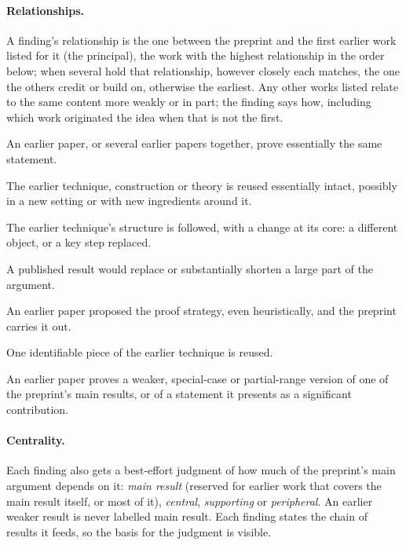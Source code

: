 \paragraph{Relationships.}
A finding's relationship is the one between the preprint and the first
earlier work listed for it (the principal), the work with the highest relationship in the
order below; when several hold that relationship, however closely each matches,
the one the others credit or build on, otherwise the earliest. Any other works listed relate to the same content more weakly or
in part; the finding says how, including which work originated the idea when
that is not the first.
\begin{description}[leftmargin=1.5em,font=\normalfont\itshape]
\item[same result.] An earlier paper, or several earlier papers together, prove essentially the same statement.
\item[same technique.] The earlier technique, construction or theory is
reused essentially intact, possibly in a new setting or with new ingredients
around it.
\item[adapted.] The earlier technique's structure is followed, with a change
at its core: a different object, or a key step replaced.
\item[proof shortcut.] A published result would replace or substantially
shorten a large part of the argument.
\item[same route.] An earlier paper proposed the proof strategy, even
heuristically, and the preprint carries it out.
\item[fragment.] One identifiable piece of the earlier technique is reused.
\item[weaker result.] An earlier paper proves a weaker, special-case or
partial-range version of one of the preprint's main results, or of a
statement it presents as a significant contribution.
\end{description}

\paragraph{Centrality.}
Each finding also gets a best-effort judgment of how much of the preprint's
main argument depends on it: \emph{main result} (reserved for earlier work that
covers the main result itself, or most of it), \emph{central},
\emph{supporting} or \emph{peripheral}. An earlier weaker result is never
labelled main result. Each finding states the chain of results it feeds, so
the basis for the judgment is visible.

